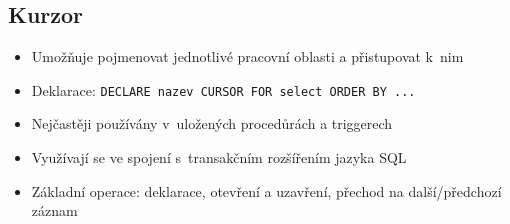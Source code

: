 \documentclass[a4paper,10pt]{article}
\begin{document}
		\subsection{Kurzor}
			\begin{itemize}
				\item Umožňuje pojmenovat jednotlivé pracovní oblasti a přistupovat k~nim
				\item Deklarace: \texttt{DECLARE nazev CURSOR FOR select ORDER BY ...}
				\item Nejčastěji používány v~uložených procedůrách a triggerech
				\item Využívají se ve spojení s~transakčním rozšířením jazyka SQL
				\item Základní operace: deklarace, otevření a uzavření, přechod na další/předchozí záznam
			\end{itemize}
\end{document}
